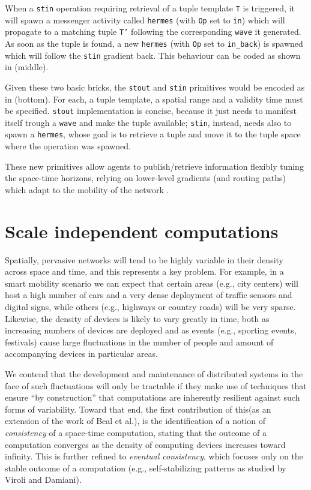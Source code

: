 \documentclass[12pt,a4paper,twoside,openright]{book}
\begin{document}
When a \texttt{stin} operation requiring retrieval of a tuple template \texttt{T} is triggered, it will spawn a messenger activity called \texttt{hermes} (with \texttt{Op} set to \texttt{in}) which will propagate to a matching tuple \texttt{T'} following the corresponding \texttt{wave} it generated. As soon as the tuple is found, a new \texttt{hermes} (with \texttt{Op} set to \texttt{in\_back}) is spawned which will follow the \texttt{stin} gradient back. This behaviour can be coded as shown in  (middle). 

Given these two basic bricks, the \texttt{stout} and \texttt{stin} primitives would be encoded as in  (bottom). For each, a tuple template, a spatial range and a validity time must be specified. \texttt{stout} implementation is concise, because it just needs to manifest itself trough a \texttt{wave} and make the tuple available; \texttt{stin}, instead, needs also to spawn a \texttt{hermes}, whose goal is to retrieve a tuple and move it to the tuple space where the operation was spawned.

These new primitives allow agents to publish/retrieve information flexibly tuning the space-time horizons, relying on lower-level gradients (and routing paths) which adapt to the mobility of the network \cite{flexiblegradients}.

\chapter{Scale independent computations}
\label{scale-independent-computations}

Spatially, pervasive networks will tend to be highly variable in their density across space and time, and this represents a key problem.
%
For example, in a smart mobility scenario we can expect that certain areas (e.g., city centers) will host a high number of cars and a very dense deployment of traffic sensors and digital signs, while others (e.g., highways or country roads) will be very sparse.
%
Likewise, the density of devices is likely to vary greatly in time, both as increasing numbers of devices are deployed and as events (e.g., sporting events, festivals) cause large fluctuations in the number of people and amount of accompanying devices in particular areas.

We contend that the development and maintenance of distributed systems in the face of such fluctuations will only be tractable if they make use of techniques that ensure ``by construction'' that computations are inherently resilient against such forms of variability.
%
Toward that end, the first contribution of this\levelText{}(as an extension of the work of Beal et al.\cite{BVD-SCW14}), is the identification of a notion of \emph{consistency} of a space-time computation, stating that the outcome of a computation converges as the density of computing devices increases toward infinity.
%
This is further refined to \emph{eventual consistency}, which focuses only on the stable outcome of a computation (e.g., self-stabilizing patterns as studied by Viroli and Damiani\cite{VD-COORD2014-LNCS2014}).
\end{document}
